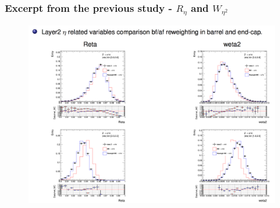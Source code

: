 \documentclass{beamer}
\begin{document}
\begin{frame}
\frametitle{Excerpt from the previous study - $R_{\eta}$ and $W_{\eta^2}$ }

\begin{figure}
\centering
\includegraphics[width=11cm]{Screen_Shot.png}\\
\end{figure}

\end{frame}
\end{document}
